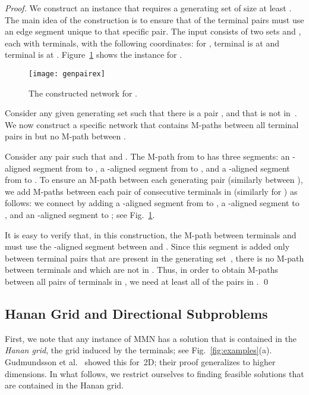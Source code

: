\documentclass[11pt]{llncs}
\newcommand{\etal}{et al.}
\newenvironment{pf}{\begin{proof}}{\qed\end{proof}}
\begin{document}
\begin{pf}
  We construct an instance that requires a generating set of size at
  least . The main idea of the construction is to ensure that
   of the terminal pairs must use an edge segment unique to
  that specific pair.  The input consists of two sets  and ,
  each with  terminals, with the following coordinates: for , terminal  is at  and terminal  is at .  Figure~\ref{fig:genpairex} shows the instance for
  .

  \begin{figure}
    \centering
    \texttt{[image: genpairex]}
    \caption{The constructed network for .}
    \label{fig:genpairex}
  \end{figure}
  Consider any given generating set
   such that there is a pair , 
   and  that is not in~.
  We now construct a specific network that contains M-paths between all 
  terminal pairs in  but no M-path between .
  
  Consider any pair  such that  and
  .  The
  M-path from  to  has three segments: an -aligned segment 
  from  to , a -aligned segment 
  from  to , and a -aligned segment 
  from  to . To ensure an M-path between
  each generating pair  (similarly between
  ), we add M-paths between each pair of
  consecutive terminals in  (similarly for ) as follows:
  we connect  
by adding a -aligned segment from  to , a
  -aligned segment to , and an -aligned segment to
  ; see Fig.~\ref{fig:genpairex}.

  It is easy to verify that, in this construction, the M-path between
  terminals  and  must use
  the -aligned segment between  and
  .  Since this segment is added only between terminal
  pairs that are present in the generating set~, there is no
  M-path between terminals  and 
  which are not in . Thus, in order to obtain M-paths between all
  pairs of terminals in , we need at least all of the
   pairs in .
\end{pf}

\subsection{Hanan Grid and Directional Subproblems}
\label{sec:hann-grid-direct}

First, we note that any instance of MMN has a solution that is
contained in the \emph{Hanan grid}, the grid induced by the terminals;
see Fig.~\ref{fig:examples}(a).  Gudmundsson \etal~\cite{gln-ammn-01}
showed this for~2D; their proof generalizes to higher dimensions.  In
what follows, we restrict ourselves to finding feasible solutions
that are contained in the Hanan grid.
\end{document}
